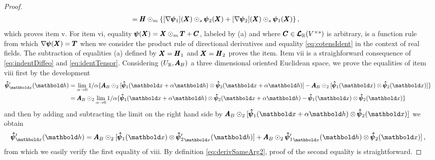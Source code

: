 {\begin{proof}
\begin{align*}
&=\pmb{H}\odot_m\{[\nabla\pmb{\psi}_1](\pmb{X})\odot_s\pmb{\psi}_2(\pmb{X})+[\nabla\pmb{\psi}_2](\pmb{X})\odot_s\pmb{\psi}_1(\pmb{X})\}\,,
\end{align*}
which proves item v. For item vi, equality $\pmb{\psi}(\pmb{X})=\pmb{X}\odot_m\pmb{T}+\pmb{C}$, labeled by (a) and where $\pmb{C}\in\pmb{\mathcal{L}}_{\mathbb{R}}(V^{\times s})$ is arbitrary, is a function rule from which $\nabla\pmb{\psi}(\pmb{X})=\pmb{T}$ when we consider the product rule of directional derivatives and equality \eqref{eq:cotensIdent} in the context of real fields. The subtraction of equalities (a) defined by $\pmb{X}=\pmb{H}_1$ and $\pmb{X}=\pmb{H}_2$ proves the item. Item vii is a straighforward consequence of \eqref{eq:indentDiffeo} and \eqref{eq:identTensor}. Considering $(U_{\mathbb{R}},\pmb{A}_B)$ a three dimensional oriented Euclidean space, we prove the equalities of item viii first by the development
\begin{align*}
\fua{\tnr{\hat\psi}'_{\vto{x}}}{\vto{h}}&=\lim_{\alpha\to 0}1/\alpha\{\tnr{A}_B\odot_{2}[\fua{\tnr{\hat\psi}_1}{\vto{x}+\alpha\vto{h}}\otimes\fua{\tnr{\hat\psi}_2}{\vto{x}+\alpha\vto{h}}]-\tnr{A}_B\odot_{2}[\fua{\tnr{\hat\psi}_1}{\vto{x}}\otimes\fua{\tnr{\hat\psi}_2}{\vto{x}}]\}\\
&=\tnr{A}_B\odot_{2}\lim_{\alpha\to 0}1/\alpha\{\fua{\tnr{\hat\psi}_1}{\vto{x}+\alpha\vto{h}}\otimes\fua{\tnr{\hat\psi}_2}{\vto{x}+\alpha\vto{h}}-\fua{\tnr{\hat\psi}_1}{\vto{x}}\otimes\fua{\tnr{\hat\psi}_2}{\vto{x}}\}
\end{align*}
and then by adding and subtracting the limit on the right hand side by $\tnr{A}_B\odot_{2}[\fua{\tnr{\hat\psi}_1}{\vto{x}+\alpha\vto{h}}\otimes\fua{\tnr{\hat\psi}_2}{\vto{x}}]$ we obtain
\begin{equation*}
\fua{\tnr{\hat\psi}'_{\vto{x}}}{\vto{h}}= \tnr{A}_B\odot_{2}[\fua{\tnr{\hat\psi}_1}{\vto{x}}\otimes\fua{{\tnr{\hat\psi}_2'}_{\vto{x}}}{\vto{h}}]+\tnr{A}_B\odot_{2}\fua{{\tnr{\hat\psi}_1'}_{\vto{x}}}{\vto{h}} \otimes \fua{\tnr{\hat\psi}_2}{\vto{x}}]\,,
\end{equation*}
from which we easily verify the first equality of viii. By definition \eqref{eq:derivSameArg2}, proof of the second equality is straightforward. 
\end{proof}}

